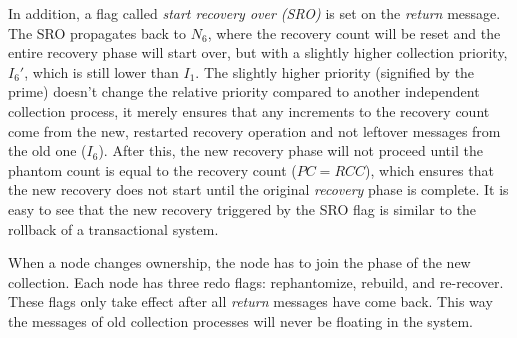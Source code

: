 In addition, a flag called \emph{start recovery over (SRO)} is set on the
\emph{return} message.
The SRO propagates back to $N_6$, where the recovery count will
be reset and the entire recovery phase will start over,
but with a slightly
higher collection priority, $I_6'$, which is still lower than $I_1$.  The slightly higher priority
(signified by the prime)
doesn't change the relative priority compared to another independent collection process, it merely
ensures that any
increments to the recovery count come from the new, restarted recovery
operation and not leftover messages from the old one ($I_6$).
After this, the new recovery phase
will not proceed until the phantom count is equal to the recovery count ($PC = RCC$), which ensures that the new recovery
does not start until the original \emph{recovery} phase is complete.
It is easy to see that the new recovery
triggered by the SRO flag is similar to the rollback of a transactional system.


When a node changes ownership, the node has to join the phase of the new collection.
Each
node has three redo flags: rephantomize, rebuild,
and re-recover.
These flags only take effect
after all \emph{return} messages %
have come back.
This way the messages of old collection processes will never be floating
in the system.


